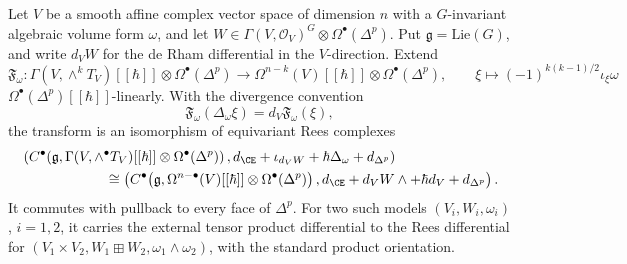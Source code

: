 \begin{lemma}
\label{lem:relative-fourier-bv-rees-identification}
\ClaimStatusProvedHere
Let $V$ be a smooth affine complex vector space of dimension $n$ with a
$G$-invariant algebraic volume form $\omega$, and let
$W\in\Gamma(V,\mathcal O_V)^G\otimes\Omega^\bullet(\Delta^p)$. Put
$\mathfrak g=\mathrm{Lie}(G)$, and write $d_VW$ for the de Rham
differential in the $V$-direction. Extend
\[
 \mathfrak F_{\omega}\colon
 \Gamma(V,\wedge^kT_V)[[\hbar]]\otimes\Omega^\bullet(\Delta^p)
 \longrightarrow
 \Omega^{n-k}(V)[[\hbar]]\otimes\Omega^\bullet(\Delta^p),
 \qquad
 \xi\longmapsto (-1)^{k(k-1)/2}\iota_\xi\omega
\]
$\Omega^\bullet(\Delta^p)[[\hbar]]$-linearly. With the divergence
convention
\[
 \mathfrak F_\omega(\Delta_\omega\xi)=d_V\mathfrak F_\omega(\xi),
\]
the transform is an isomorphism of equivariant Rees complexes
\[
\begin{aligned}
&\left(
 C^\bullet\!\left(
 \mathfrak g,
 \Gamma(V,\wedge^\bullet T_V)[[\hbar]]
 \otimes\Omega^\bullet(\Delta^p)
 \right),
 d_{\CE}+\iota_{d_VW}+\hbar\Delta_\omega+d_{\Delta^p}
 \right)
\\
&\hspace{6em}\cong
 \left(
 C^\bullet\!\left(
 \mathfrak g,
 \Omega^{n-\bullet}(V)[[\hbar]]
 \otimes\Omega^\bullet(\Delta^p)
 \right),
 d_{\CE}+d_VW\wedge+\hbar d_V+d_{\Delta^p}
 \right).
\end{aligned}
\]
It commutes with pullback to every face of $\Delta^p$. For two such
models $(V_i,W_i,\omega_i)$, $i=1,2$, it carries the external tensor
product differential to the Rees differential for
$(V_1\times V_2,W_1\boxplus W_2,\omega_1\wedge\omega_2)$, with the
standard product orientation.
\end{lemma}

